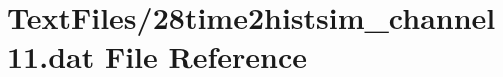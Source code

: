 \hypertarget{28time2histsim__channel11_8dat}{}\section{Text\+Files/28time2histsim\+\_\+channel11.dat File Reference}
\label{28time2histsim__channel11_8dat}
